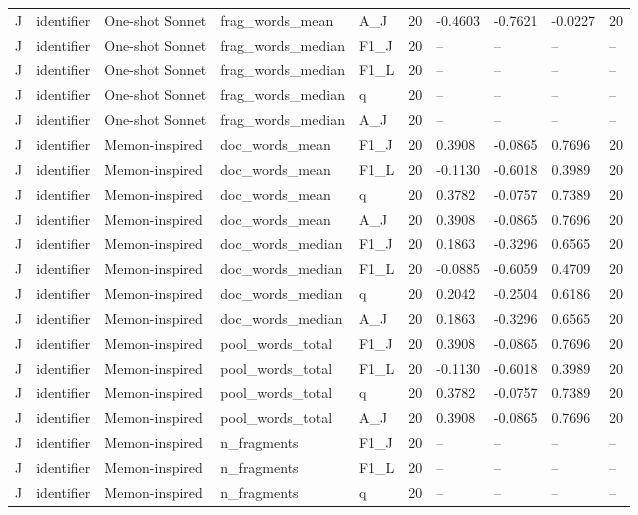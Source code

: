 \begin{table}[t]
{\begin{tabular}{llllllllll}
J & identifier & One-shot Sonnet & frag\_words\_mean & A\_J & 20 & -0.4603 & -0.7621 & -0.0227 & 20 \\
J & identifier & One-shot Sonnet & frag\_words\_median & F1\_J & 20 & -- & -- & -- & -- \\
J & identifier & One-shot Sonnet & frag\_words\_median & F1\_L & 20 & -- & -- & -- & -- \\
J & identifier & One-shot Sonnet & frag\_words\_median & q & 20 & -- & -- & -- & -- \\
J & identifier & One-shot Sonnet & frag\_words\_median & A\_J & 20 & -- & -- & -- & -- \\
J & identifier & Memon-inspired & doc\_words\_mean & F1\_J & 20 & 0.3908 & -0.0865 & 0.7696 & 20 \\
J & identifier & Memon-inspired & doc\_words\_mean & F1\_L & 20 & -0.1130 & -0.6018 & 0.3989 & 20 \\
J & identifier & Memon-inspired & doc\_words\_mean & q & 20 & 0.3782 & -0.0757 & 0.7389 & 20 \\
J & identifier & Memon-inspired & doc\_words\_mean & A\_J & 20 & 0.3908 & -0.0865 & 0.7696 & 20 \\
J & identifier & Memon-inspired & doc\_words\_median & F1\_J & 20 & 0.1863 & -0.3296 & 0.6565 & 20 \\
J & identifier & Memon-inspired & doc\_words\_median & F1\_L & 20 & -0.0885 & -0.6059 & 0.4709 & 20 \\
J & identifier & Memon-inspired & doc\_words\_median & q & 20 & 0.2042 & -0.2504 & 0.6186 & 20 \\
J & identifier & Memon-inspired & doc\_words\_median & A\_J & 20 & 0.1863 & -0.3296 & 0.6565 & 20 \\
J & identifier & Memon-inspired & pool\_words\_total & F1\_J & 20 & 0.3908 & -0.0865 & 0.7696 & 20 \\
J & identifier & Memon-inspired & pool\_words\_total & F1\_L & 20 & -0.1130 & -0.6018 & 0.3989 & 20 \\
J & identifier & Memon-inspired & pool\_words\_total & q & 20 & 0.3782 & -0.0757 & 0.7389 & 20 \\
J & identifier & Memon-inspired & pool\_words\_total & A\_J & 20 & 0.3908 & -0.0865 & 0.7696 & 20 \\
J & identifier & Memon-inspired & n\_fragments & F1\_J & 20 & -- & -- & -- & -- \\
J & identifier & Memon-inspired & n\_fragments & F1\_L & 20 & -- & -- & -- & -- \\
J & identifier & Memon-inspired & n\_fragments & q & 20 & -- & -- & -- & -- \\

\end{tabular}}
\end{table}
